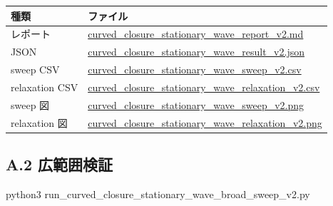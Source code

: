 \documentclass[
  a4paper,
]{article}
\newenvironment{Shaded}{}{}
\newcommand{\NormalTok}[1]{#1}
\newcounter{none} %
\begin{document}
{\def\LTcaptype{none} %
\begin{longtable}[]{@{}
  >{\raggedright\arraybackslash}p{}
  >{\raggedright\arraybackslash}p{}@{}}
\toprule\noalign{}
\begin{minipage}[b]{\linewidth}\raggedright
種類
\end{minipage} & \begin{minipage}[b]{\linewidth}\raggedright
ファイル
\end{minipage} \\
\midrule\noalign{}
\endhead
\bottomrule\noalign{}
\endlastfoot
レポート &
\href{curved_closure_stationary_wave_result_v2/curved_closure_stationary_wave_report_v2.md}{curved\_closure\_stationary\_wave\_report\_v2.md} \\
JSON &
\href{curved_closure_stationary_wave_result_v2/curved_closure_stationary_wave_result_v2.json}{curved\_closure\_stationary\_wave\_result\_v2.json} \\
sweep CSV &
\href{curved_closure_stationary_wave_result_v2/curved_closure_stationary_wave_sweep_v2.csv}{curved\_closure\_stationary\_wave\_sweep\_v2.csv} \\
relaxation CSV &
\href{curved_closure_stationary_wave_result_v2/curved_closure_stationary_wave_relaxation_v2.csv}{curved\_closure\_stationary\_wave\_relaxation\_v2.csv} \\
sweep 図 &
\href{curved_closure_stationary_wave_result_v2/curved_closure_stationary_wave_sweep_v2.png}{curved\_closure\_stationary\_wave\_sweep\_v2.png} \\
relaxation 図 &
\href{curved_closure_stationary_wave_result_v2/curved_closure_stationary_wave_relaxation_v2.png}{curved\_closure\_stationary\_wave\_relaxation\_v2.png} \\
\end{longtable}
}

\subsection{A.2 広範囲検証}\label{a.2-ux5e83ux7bc4ux56f2ux691cux8a3c}

\begin{Shaded}
\begin{Highlighting}[]
\NormalTok{python3 run\_curved\_closure\_stationary\_wave\_broad\_sweep\_v2.py}
\end{Highlighting}
\end{Shaded}
\end{document}
